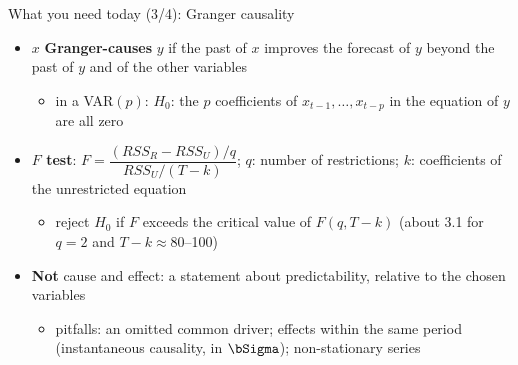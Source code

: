 \begin{frame}{What you need today (3/4): Granger causality}
\itemsize{\small}
\begin{itemize}
    \item $x$ \textbf{Granger-causes} $y$ if the past of $x$ improves the forecast of $y$ beyond the past of $y$ and of the other variables
    \begin{itemize}
        \item in a VAR$(p)$: $H_0$: the $p$ coefficients of $x_{t-1}, \dots, x_{t-p}$ in the equation of $y$ are all zero
    \end{itemize}
    \item \textbf{$F$ test}: $F = \dfrac{(RSS_R - RSS_U)/q}{RSS_U/(T - k)}$; $q$: number of restrictions; $k$: coefficients of the unrestricted equation
    \begin{itemize}
        \item reject $H_0$ if $F$ exceeds the critical value of $F(q, T - k)$ (about 3.1 for $q = 2$ and $T - k \approx 80$--100)
    \end{itemize}
    \item \textbf{Not} cause and effect: a statement about predictability, relative to the chosen variables
    \begin{itemize}
        \item pitfalls: an omitted common driver; effects within the same period (instantaneous causality, in $\bSigma$); non-stationary series
    \end{itemize}
\end{itemize}
\end{frame}

